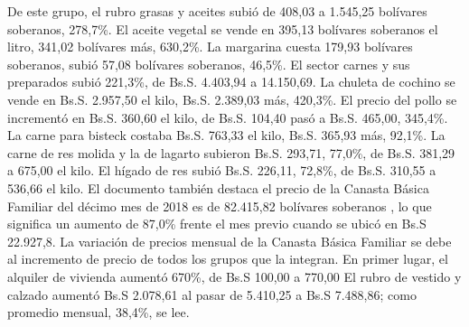 \documentclass{article}%
\begin{document}
\newline%
%
De este grupo, el rubro grasas y aceites subió de 408,03 a 1.545,25 bolívares soberanos, 278,7\%.%
\newline%
%
El aceite vegetal se vende en 395,13 bolívares soberanos el litro, 341,02 bolívares más, 630,2\%.  La margarina cuesta 179,93 bolívares soberanos, subió 57,08 bolívares soberanos, 46,5\%. \newline%
\newline%
El sector carnes y sus preparados subió 221,3\%, de Bs.S. 4.403,94 a 14.150,69.%
\newline%
%
La chuleta de cochino se vende en Bs.S. 2.957,50 el kilo, Bs.S. 2.389,03 más, 420,3\%.%
\newline%
%
El precio del pollo se incrementó en Bs.S. 360,60 el kilo, de Bs.S. 104,40 pasó a Bs.S. 465,00, 345,4\%. La carne para bisteck costaba Bs.S. 763,33 el kilo, Bs.S. 365,93 más, 92,1\%.  La carne de res molida y la de lagarto subieron Bs.S. 293,71, 77,0\%, de Bs.S. 381,29 a 675,00 el kilo.%
\newline%
%
El hígado de res subió Bs.S. 226,11, 72,8\%, de Bs.S. 310,55 a 536,66 el kilo.%
\newline%
%
El documento también destaca el precio de la Canasta Básica Familiar del décimo mes de 2018 es de 82.415,82 bolívares soberanos , lo que significa un aumento de 87,0\% frente el mes previo cuando se ubicó en Bs.S 22.927,8.%
\newline%
%
La variación de precios mensual de la Canasta Básica Familiar se debe al incremento de precio de todos los grupos que la integran.%
\newline%
%
En primer lugar, el alquiler de vivienda aumentó 670\%, de Bs.S 100,00 a 770,00\newline%
\newline%
El rubro de vestido y calzado aumentó Bs.S 2.078,61 al pasar de 5.410,25 a Bs.S 7.488,86; como promedio mensual, 38,4\%, se lee.%
\newline%
%
\end{document}
